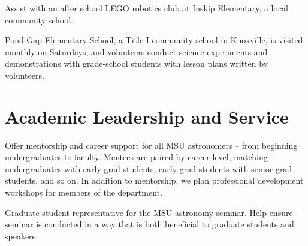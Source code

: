 \documentclass[letterpaper]{deedy-resume} %
\begin{document}


Assist with an after school LEGO robotics club at Inskip Elementary, a local community school.
\sectionspace %



Pond Gap Elementary School, a Title I community school in Knoxville, is visited monthly on Saturdays, and volunteers conduct science experiments and demonstrations with grade-school students with lesson plans written by volunteers.
\sectionspace %



\section{Academic Leadership and Service}

\protected{}
Offer mentorship and career support for all MSU astronomers -- from beginning undergraduates to faculty. Mentees are paired by career level, matching undergraduates with early grad students,
early grad students with senior grad students, and so on. In addition to mentorship, we plan professional development workshops for members of the department.
\sectionspace %


Graduate student representative for the MSU astronomy seminar. Help ensure seminar is conducted in a way that is both beneficial to graduate students and speakers.
\sectionspace %

\end{document}
